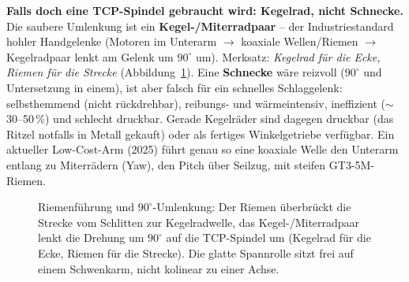 \textbf{Falls doch eine TCP-Spindel gebraucht wird: Kegelrad, nicht Schnecke.}
Die saubere Umlenkung ist ein \textbf{Kegel-/Miterradpaar} -- der
Industriestandard hohler Handgelenke (Motoren im Unterarm $\rightarrow$ koaxiale
Wellen/Riemen $\rightarrow$ Kegelradpaar lenkt am Gelenk um $90^\circ$ um).
Merksatz: \emph{Kegelrad f\"ur die Ecke, Riemen f\"ur die Strecke}
(Abbildung~\ref{fig:ttr-arm-kegel}). Eine \textbf{Schnecke} w\"are reizvoll
($90^\circ$ und Untersetzung in einem), ist aber falsch f\"ur ein schnelles
Schlaggelenk: selbsthemmend (nicht r\"uckdrehbar), reibungs- und w\"armeintensiv,
ineffizient ($\sim$30--50\,\%) und schlecht druckbar. Gerade Kegelr\"ader sind
dagegen druckbar (das Ritzel notfalls in Metall gekauft) oder als fertiges
Winkelgetriebe verf\"ugbar. Ein aktueller Low-Cost-Arm (2025) f\"uhrt genau so
eine koaxiale Welle den Unterarm entlang zu Miterr\"adern (Yaw), den Pitch \"uber
Seilzug, mit steifen GT3-5M-Riemen.

\begin{figure}[htbp]
\centering
{}
\caption{Riemenf\"uhrung und $90^\circ$-Umlenkung: Der Riemen \"uberbr\"uckt die
Strecke vom Schlitten zur Kegelradwelle, das Kegel-/Miterradpaar lenkt die Drehung
um $90^\circ$ auf die TCP-Spindel um (\glqq Kegelrad f\"ur die Ecke, Riemen f\"ur
die Strecke\grqq). Die glatte Spannrolle sitzt frei auf einem Schwenkarm, nicht
kolinear zu einer Achse.}
\label{fig:ttr-arm-kegel}
\end{figure}

